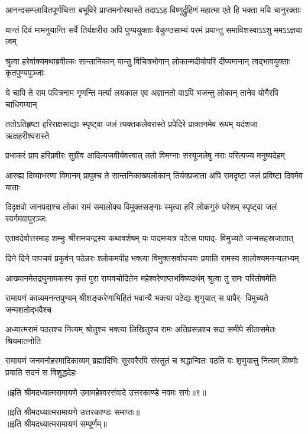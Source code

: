 \fourlineindentedshloka
{आनन्दसम्प्लावितपूर्णचित्ता}
{बभूविरे प्राप्तमनोरथास्ते}
{तदाऽऽह विष्णुर्द्रुहिणं महात्मा}
{एते हि भक्ता मयि चानुरक्ताः} %

\fourlineindentedshloka
{यान्तं दिवं मामनुयान्ति सर्वे}
{तिर्यक्षरीरा अपि पुण्ययुक्ताः}
{वैकुण्ठसाम्यं परमं प्रयान्तु}
{समाविशस्वाऽऽशु ममऽऽज्ञया त्वम्} %

\fourlineindentedshloka
{श्रुत्वा हरेर्वाक्यमथाब्रवीत्कः}
{सान्तानिकान् यान्तु विचित्रभोगान्}
{लोकान्मदीयोपरि दीप्यमानान्}
{त्वद्भावयुक्ताः कृतपुण्यपुञ्जाः} %

\fourlineindentedshloka
{ये चापि ते राम पवित्रनाम}
{गृणन्ति मर्त्या लयकाल एव}
{अज्ञानतो वाऽपि भजन्तु लोकान्}
{तानेव योगैरपि चाधिगम्यान्} %

\fourlineindentedshloka
{ततोऽतिहृष्टा हरिराक्षसाद्याः}
{स्पृष्ट्वा जलं त्यक्तकलेवरास्ते}
{प्रपेदिरे प्राक्तनमेव रूपम्}
{यदंशजा ऋक्षहरीश्वरास्ते} %

\fourlineindentedshloka
{प्रभाकरं प्राप हरिप्रवीरः}
{सुग्रीव आदित्यजवीर्यवत्त्वात्}
{ततो विमग्नाः सरयूजलेषु}
{नराः परित्यज्य मनुष्यदेहम्} %

\fourlineindentedshloka
{आरुह्य दिव्याभरणा विमानम्}
{प्रापुश्च ते सान्तनिकाख्यलोकान्}
{तिर्यक्प्रजाता अपि रामदृष्टा}
{जलं प्रविष्टा दिवमेव याताः} %

\fourlineindentedshloka
{दिदृक्षवो जानपदाश्च लोका}
{रामं समालोक्य विमुक्तसङ्गाः}
{स्मृत्वा हरिं लोकगुरुं परेशम्}
{स्पृष्ट्वा जलं स्वर्गमवापुरञ्जः} %

\fourlineindentedshloka
{एतावदेवोत्तरमाह शम्भुः}
{श्रीरामचन्द्रस्य कथावशेषम्}
{यः पादमप्यत्र पठेत्स पापाद्-}
{विमुच्यते जन्मसहस्रजातात्} %

\fourlineindentedshloka
{दिने दिने पापचयं प्रकुर्वन्}
{पठेन्नरः श्लोकमपीह भक्त्या}
{विमुक्तसर्वाघचयः प्रयाति}
{रामस्य सालोक्यमनन्यलभ्यम्} %

\fourlineindentedshloka
{आख्यानमेतद्रघुनायकस्य}
{कृतं पुरा राघवचोदितेन}
{महेश्वरेणाप्तभविष्यदर्थम्}
{श्रुत्वा तु रामः परितोषमेति} %

\fourlineindentedshloka
{रामायणं काव्यमनन्तपुण्यम्}
{श्रीशङ्करेणाभिहितं भवान्यै}
{भक्त्या पठेद्यः शृणुयात् स पापैर्-}
{विमुच्यते जन्मशतोद्भवैश्च} %

\fourlineindentedshloka
{अध्यात्मरामं पठतश्च नित्यम्}
{श्रोतुश्च भक्त्या लिखितुश्च रामः}
{अतिप्रसन्नश्च सदा समीपे}
{सीतासमेतः श्रियमातनोति} %

\fourlineindentedshloka
{रामायणं जनमनोहरमादिकाव्यम्}
{ब्रह्मादिभिः सुरवरैरपि संस्तुतं च}
{श्रद्धान्वितः पठति यः शृणुयात्तु नित्यम्}
{विष्णोः प्रयाति सदनं स विशुद्धदेहः} %

{॥इति श्रीमदध्यात्मरामायणे उमामहेश्वरसंवादे
उत्तरकाण्डे नवमः सर्गः॥९॥}

॥इति श्रीमदध्यात्मरामायणे उत्तरकाण्डः समाप्तः॥\\
॥इति श्रीमदध्यात्मरामायणं सम्पूर्णम्॥